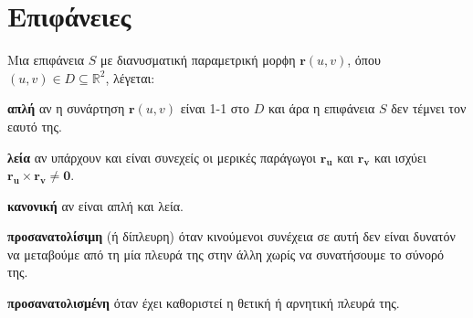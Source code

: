 




\pagestyle{askhseis}



\chapter*{Επιφάνειες}

\setcounter{chapter}{1}




\begin{dfn}
  Μια επιφάνεια $S$ με διανυσματική παραμετρική μορϕη $ \mathbf{r}(u,v) $, όπου 
  $ (u,v) \in D \subseteq \mathbb{R}^{2} $, λέγεται:
  \begin{myitemize}
    \item \textbf{απλή} αν η συνάρτηση $ \mathbf{r}(u,v) $ είναι 1-1 στο $D$ και άρα
      η επιφάνεια $S$ δεν τέμνει τον εαυτό της.
    \item \textbf{λεία} αν υπάρχουν και είναι συνεχείς οι μερικές παράγωγοι 
      $ \mathbf{r_{u}}$ και $ \mathbf{r_{v}} $ και ισχύει 
      $ \mathbf{r_{u}} \times \mathbf{r_{v}} \neq \mathbf{0} $.
    \item \textbf{κανονική} αν είναι απλή και λεία. 
    \item \textbf{προσανατολίσιμη} (ή δίπλευρη) όταν κινούμενοι συνέχεια σε αυτή δεν 
      είναι δυνατόν να μεταβούμε από τη μία πλευρά της στην άλλη χωρίς να συνατήσουμε το 
      σύνορό της.
    \item \textbf{προσανατολισμένη} όταν έχει καθοριστεί η θετική ή αρνητική πλευρά της.
  \end{myitemize}
\end{dfn}

